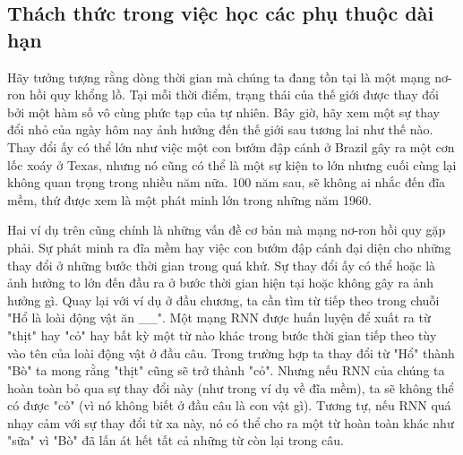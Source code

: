 

\subsection{Thách thức trong việc học các phụ thuộc dài hạn}

Hãy tưởng tượng rằng dòng thời gian mà chúng ta đang tồn tại là một mạng nơ-ron hồi quy khổng lồ. Tại mỗi thời điểm, trạng thái của thế giới được thay đổi bởi một hàm số vô cùng phức tạp của tự nhiên. Bây giờ, hãy xem một sự thay đổi nhỏ của ngày hôm nay ảnh hưởng đến thế giới sau tương lai như thế nào. Thay đổi ấy có thể lớn như việc một con bướm đập cánh ở Brazil gây ra một cơn lốc xoáy ở Texas, nhưng nó cũng có thể là một sự kiện to lớn nhưng cuối cùng lại không quan trọng trong nhiều năm nữa. 100 năm sau, sẽ không ai nhắc đến đĩa mềm, thứ được xem là một phát minh lớn trong những năm 1960.

Hai ví dụ trên cũng chính là những vấn đề cơ bản mà mạng nơ-ron hồi quy gặp phải. Sự phát minh ra đĩa mềm hay việc con bướm đập cánh đại diện cho những thay đổi ở những bước thời gian trong quá khứ. Sự thay đổi ấy có thể hoặc là ảnh hưởng to lớn đến đầu ra ở bước thời gian hiện tại hoặc không gây ra ảnh hưởng gì. Quay lại với ví dụ ở đầu chương, ta cần tìm từ tiếp theo trong chuỗi "Hổ là loài động vật ăn \_\_". Một mạng RNN được huấn luyện để xuất ra từ "thịt" hay "cỏ" hay bất kỳ một từ nào khác trong bước thời gian tiếp theo tùy vào tên của loài động vật ở đầu câu. Trong trường hợp ta thay đổi từ "Hổ" thành "Bò" ta mong rằng "thịt" cũng sẽ trở thành "cỏ". Nhưng nếu RNN của chúng ta hoàn toàn bỏ qua sự thay đổi này (như trong ví dụ về đĩa mềm), ta sẽ không thể có được "cỏ" (vì nó không biết ở đầu câu là con vật gì). Tương tự, nếu RNN quá nhạy cảm với sự thay đổi từ xa này, nó có thể cho ra một từ hoàn toàn khác như "sữa" vì "Bò" đã lấn át hết tất cả những từ còn lại trong câu.

